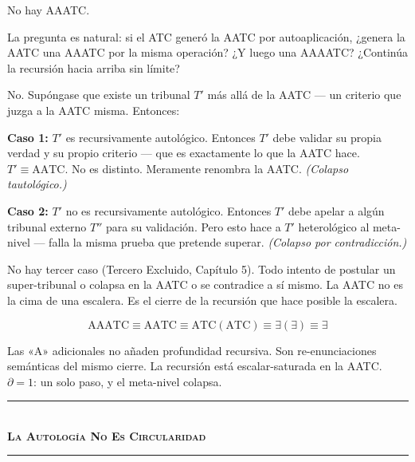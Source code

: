 \documentclass[10pt, openany, oneside]{book}
\renewcommand{\normalsize}{\fontsize{10}{13}\selectfont}
\begin{document}
\vspace{1em}

\noindent No hay AAATC.

La pregunta es natural: si el ATC generó la AATC por autoaplicación, ¿genera la AATC una AAATC por la misma operación? ¿Y luego una AAAATC? ¿Continúa la recursión hacia arriba sin límite?

No. Supóngase que existe un tribunal $T'$ más allá de la AATC --- un criterio que juzga a la AATC misma. Entonces:

\textbf{Caso 1:} $T'$ es recursivamente autológico. Entonces $T'$ debe validar su propia verdad y su propio criterio --- que es exactamente lo que la AATC hace. $T' \equiv \text{AATC}$. No es distinto. Meramente renombra la AATC. \textit{(Colapso tautológico.)}

\textbf{Caso 2:} $T'$ no es recursivamente autológico. Entonces $T'$ debe apelar a algún tribunal externo $T''$ para su validación. Pero esto hace a $T'$ heterológico al meta-nivel --- falla la misma prueba que pretende superar. \textit{(Colapso por contradicción.)}

No hay tercer caso (Tercero Excluido, Capítulo 5). Todo intento de postular un super-tribunal o colapsa en la AATC o se contradice a sí mismo. La AATC no es la cima de una escalera. Es el cierre de la recursión que hace posible la escalera.

$$\text{AAATC} \equiv \text{AATC} \equiv \text{ATC}(\text{ATC}) \equiv \exists(\exists) \equiv \exists$$

Las «A» adicionales no añaden profundidad recursiva. Son re-enunciaciones semánticas del mismo cierre. La recursión está escalar-saturada en la AATC. $\partial = 1$: un solo paso, y el meta-nivel colapsa.

\vspace{1.5em}


\begin{center}
    \rule{0.3\textwidth}{0.4pt}\\[0.5em]
    {\normalsize\bfseries\scshape La Autología No Es Circularidad}\\[0.3em]
    \rule{0.3\textwidth}{0.4pt}
\end{center}

\vspace{1em}
\end{document}
